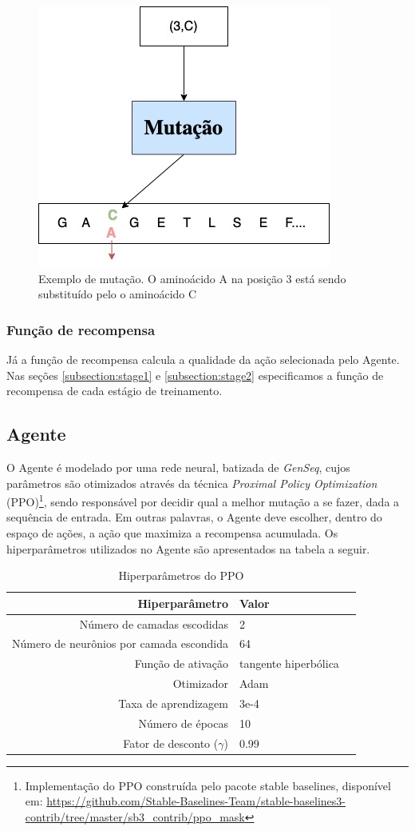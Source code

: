 \begin{figure}[H]
  \centering
  \includegraphics[width=.5\textwidth]{figuras/metodologia-Mutation.jpg}
  \caption{Exemplo de mutação. O aminoácido A na posição 3 está sendo substituído pelo o aminoácido C}
  \label{fig:mutacao}
\end{figure}

\subsubsection{Função de recompensa}
Já a função de recompensa calcula a qualidade da ação selecionada pelo Agente. 
Nas seções \ref{subsection:stage1} e \ref{subsection:stage2} especificamos a função de recompensa de cada estágio de treinamento.


\subsection{Agente}
\label{subsection:Agente}
O Agente é modelado por uma rede neural, batizada de \textit{GenSeq}, 
cujos parâmetros são otimizados através da técnica 
\textit{Proximal Policy Optimization} (PPO)\footnote{Implementação do PPO construída pelo pacote stable baselines, disponível em: \url{https://github.com/Stable-Baselines-Team/stable-baselines3-contrib/tree/master/sb3_contrib/ppo_mask}}, 
sendo responsável por decidir qual a melhor mutação a se fazer, dada a sequência de entrada. Em outras palavras, o Agente deve escolher,
dentro do espaço de ações, a ação que maximiza a recompensa acumulada.
Os hiperparâmetros utilizados no Agente são apresentados na tabela a seguir. 

\begin{table}[H]
\centering
\vspace{0.5cm}
\begin{tabular}{r|lr}
Hiperparâmetro & Valor \\ 
\hline                               
Número de camadas escodidas & 2 \\
Número de neurônios por camada escondida & 64 \\
Função de ativação & tangente hiperbólica \\
Otimizador & Adam \\
Taxa de aprendizagem & 3e-4 \\
Número de épocas & 10 \\
Fator de desconto ($\gamma$) & 0.99 \\
\end{tabular}
\caption{Hiperparâmetros do PPO}
\end{table}

